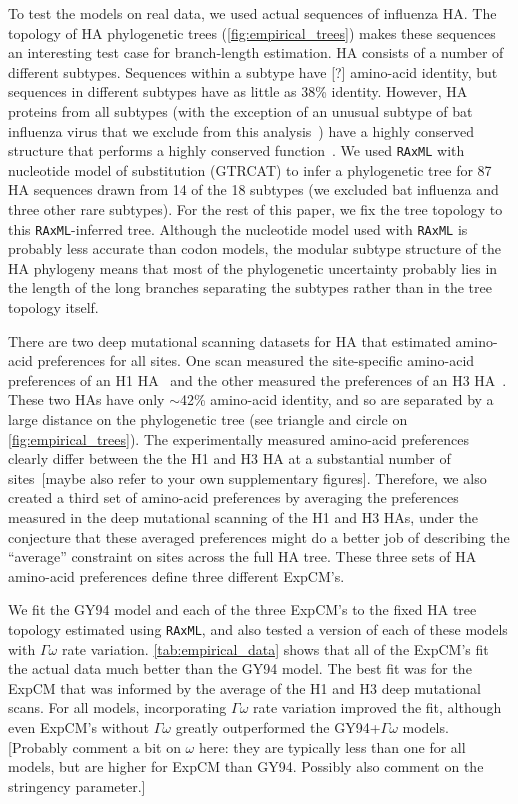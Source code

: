 \documentclass[11pt]{article}
\newcommand\jdbcomment[1]{{\color{red}[#1]}}
\begin{document}
To test the models on real data, we used actual sequences of influenza HA. 
The topology of HA phylogenetic trees (\ref{fig:empirical_trees}) makes these sequences an interesting test case for branch-length estimation.
HA consists of a number of different subtypes.
Sequences within a subtype have \jdbcomment{?} amino-acid identity, but sequences in different subtypes have as little as 38\% identity.
However, HA proteins from all subtypes (with the exception of an unusual subtype of bat influenza virus that we exclude from this analysis~\citep{zhu2013hemagglutinin,hoffmann2016hemagglutinin,sun2013bat}) have a highly conserved structure that performs a highly conserved function~\citep{ha2002h5,russell2004h1}.
We used \texttt{RAxML} with nucleotide model of substitution (GTRCAT) to infer a phylogenetic tree for 87 HA sequences drawn from 14 of the 18 subtypes (we excluded bat influenza and three other rare subtypes).
For the rest of this paper, we fix the tree topology to this \texttt{RAxML}-inferred tree.
Although the nucleotide model used with \texttt{RAxML} is probably less accurate than codon models, the modular subtype structure of the HA phylogeny means that most of the phylogenetic uncertainty probably lies in the length of the long branches separating the subtypes rather than in the tree topology itself.

There are two deep mutational scanning datasets for HA that estimated amino-acid preferences for all sites.
One scan measured the site-specific amino-acid preferences of an H1 HA~\citep{doud2016accurate} and the other measured the preferences of an H3 HA~\citep{lee2018deep}.
These two HAs have only $\sim$42\% amino-acid identity, and so are separated by a large distance on the phylogenetic tree (see triangle and circle on \ref{fig:empirical_trees}).
The experimentally measured amino-acid preferences clearly differ between the the H1 and H3 HA at a substantial number of sites~\citep{lee2018deep}\jdbcomment{maybe also refer to your own supplementary figures}.
Therefore, we also created a third set of amino-acid preferences by averaging the preferences measured in the deep mutational scanning of the H1 and H3 HAs, under the conjecture that these averaged preferences might do a better job of describing the ``average'' constraint on sites across the full HA tree.
These three sets of HA amino-acid preferences define three different ExpCM's.
 
We fit the GY94 model and each of the three ExpCM's to the fixed HA tree topology estimated using \texttt{RAxML}, and also tested a version of each of these models with $\Gamma\omega$ rate variation.
\ref{tab:empirical_data} shows that all of the ExpCM's fit the actual data much better than the GY94 model.
The best fit was for the ExpCM that was informed by the average of the H1 and H3 deep mutational scans.
For all models, incorporating $\Gamma\omega$ rate variation improved the fit, although even ExpCM's without $\Gamma\omega$ greatly outperformed the GY94+$\Gamma\omega$ models.
\jdbcomment{Probably comment a bit on $\omega$ here: they are typically less than one for all models, but are higher for ExpCM than GY94. Possibly also comment on the stringency parameter.}
\end{document}
